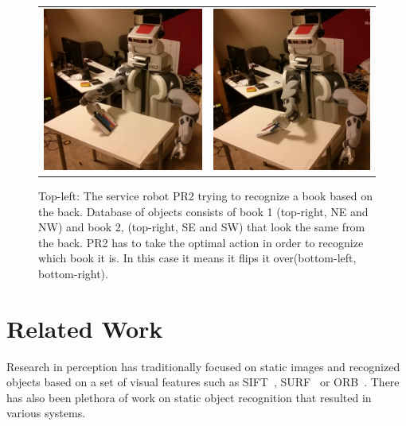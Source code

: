 \documentclass[conference]{IEEEtran}
\begin{document}
\begin{figure}[ht]
\begin{tabular}{cccc}
    \multicolumn{2}{c}{\includegraphics[width=0.45\columnwidth]{pics/pr2_grasp.jpg}}
    & \multicolumn{2}{c}{\includegraphics[width=0.45\columnwidth]{pics/pr2_rotate.jpg}}
    \end{tabular}
    \caption{Top-left: The service robot PR2 trying to recognize a book based on the back. Database of objects consists of book 1 (top-right, NE and NW) and book 2, (top-right, SE and SW) that look the same from the back. PR2 has to take the optimal action in order to recognize which book it is. In this case it means it flips it over(bottom-left, bottom-right).}
    \label{fig:pr2}
    \end{figure}


\section{Related Work}



	Research in perception has traditionally focused on  static images and recognized objects based on a set of visual features  such as SIFT~\cite{lowe2004distinctive}, SURF~\cite{bay2006surf} or ORB~\cite{rublee2011orb}.
    There has also been plethora of work on static object recognition that resulted in various systems.
	
\end{document}
